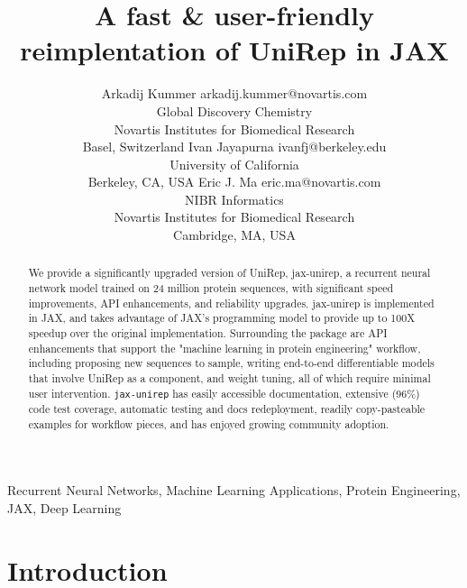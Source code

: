 \documentclass[twoside,11pt]{article}
\begin{document}
\title{A fast & user-friendly reimplentation of UniRep in JAX}

\author{\name Arkadij Kummer \email arkadij.kummer@novartis.com \\
    \addr Global Discovery Chemistry\\
    Novartis Institutes for Biomedical Research\\
    Basel, Switzerland
    \AND
    \name Ivan Jayapurna \email ivanfj@berkeley.edu \\
    \addr University of California\\
    Berkeley, CA, USA
    \AND
    \name Eric J. Ma \email eric.ma@novartis.com \\
    \addr NIBR Informatics\\
    Novartis Institutes for Biomedical Research\\
    Cambridge, MA, USA
}

\editor{}

\maketitle

\begin{abstract}%
We provide a significantly upgraded version of UniRep, jax-unirep,
a recurrent neural network model trained on 24 million protein sequences,
with significant speed improvements,
API enhancements,
and reliability upgrades.
jax-unirep is implemented in JAX,
and takes advantage of JAX's programming model
to provide up to 100X speedup over the original implementation.
Surrounding the package are API enhancements
that support the "machine learning in protein engineering" workflow,
including proposing new sequences to sample,
writing end-to-end differentiable models that involve UniRep as a component,
and weight tuning,
all of which require minimal user intervention.
\verb|jax-unirep| has easily accessible documentation,
extensive (96\%) code test coverage,
automatic testing and docs redeployment,
readily copy-pasteable examples for workflow pieces,
and has enjoyed growing community adoption.
\end{abstract}

\begin{keywords}
  Recurrent Neural Networks, Machine Learning Applications,
  Protein Engineering, JAX, Deep Learning
\end{keywords}

\section{Introduction}
\end{document}
